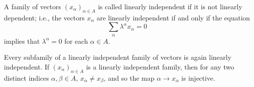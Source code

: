 A family of vectors $(x_\alpha)_{\alpha \in A}$ is called linearly independent if it is not linearly dependent; i.e., the vectors $x_\alpha$ are linearly independent if and only if the equation
$$\sum_\alpha \lambda^\alpha x_\alpha = 0$$
implies that $\lambda^\alpha = 0$ for each $\alpha \in A$.

Every subfamily of a linearly independent family of vectors is again linearly independent. If $(x_\alpha)_{\alpha \in A}$ is a linearly independent family, then for any two distinct indices $\alpha, \beta \in A$, $x_\alpha \neq x_\beta$, and so the map $\alpha \to x_\alpha$ is injective.
